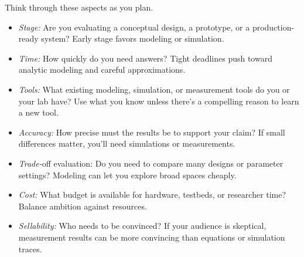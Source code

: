 Think through these aspects as you plan.
\begin{itemize}
    \item \textit{Stage:} Are you evaluating a conceptual design, a prototype, or a production-ready system? Early stage favors modeling or simulation.
    \item \textit{Time:} How quickly do you need answers? Tight deadlines push toward analytic modeling and careful approximations.
    \item \textit{Tools:} What existing modeling, simulation, or measurement tools do you or your lab have? Use what you know unless there’s a compelling reason to learn a new tool.
    \item \textit{Accuracy:} How precise must the results be to support your claim? If small differences matter, you’ll need simulations or measurements.
    \item \textit{Trade-}off evaluation: Do you need to compare many designs or parameter settings? Modeling can let you explore broad spaces cheaply.
    \item \textit{Cost:} What budget is available for hardware, testbeds, or researcher time? Balance ambition against resources.
    \item \textit{Sellability:} Who needs to be convinced? If your audience is skeptical, measurement results can be more convincing than equations or simulation traces.
\end{itemize}

